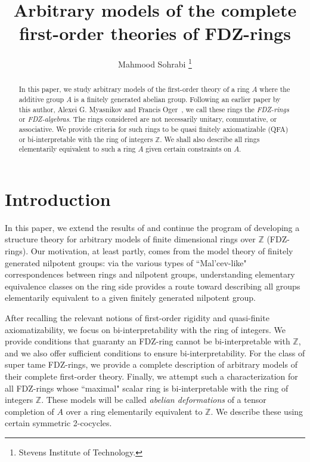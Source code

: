 \documentclass{article}
\title{Arbitrary models of the complete first-order theories of FDZ-rings }
\author{Mahmood Sohrabi \footnote{Stevens Institute of Technology.}}
\date{}
\theoremstyle{remark}
\def\Z{{\mathbb{Z}}}
\begin{document}
\maketitle

\begin{abstract}
In this paper, we study arbitrary models of the first-order theory of a  ring $A$ where the additive group $A$ is a finitely generated abelian group. Following an earlier paper by this author, Alexei G. Myasnikov and Francis Oger~\cite{MOS}, we call these rings the \emph{FDZ-rings} or \emph{FDZ-algebras}. The rings considered are not necessarily unitary, commutative, or associative. We provide criteria for such rings to be quasi finitely axiomatizable (QFA) or bi-interpretable with the ring of integers $\Z$. We shall also describe all rings elementarily equivalent to such a ring $A$ given certain constraints on $A$.
\end{abstract}


\tableofcontents





\maketitle

\section{Introduction}
In this paper, we extend the results of \cite{MOS} and continue the program of developing a structure theory for arbitrary models of finite dimensional rings over $\mathbb{Z}$ (FDZ-rings). Our motivation, at least partly, comes from the model theory of finitely generated nilpotent groups: via the various types of ``Mal'cev-like" correspondences between rings and nilpotent groups, understanding elementary equivalence classes on the ring side provides a route toward describing all groups elementarily equivalent to a given finitely generated nilpotent group. 

After recalling the relevant notions of first-order rigidity and quasi-finite axiomatizability, we focus on bi-interpretability with the ring of integers. We provide conditions that guaranty an FDZ-ring cannot be bi-interpretable with $\mathbb{Z}$, and we also offer sufficient conditions to ensure bi-interpretability. For the class of super tame FDZ-rings, we provide a complete description of arbitrary models of their complete first-order theory. Finally, we attempt such a characterization for all FDZ-rings whose ``maximal" scalar ring is bi-interpretable with the ring of integers $\Z$. These models will be called \emph{abelian deformations} of a tensor completion of $A$ over a ring elementarily equivalent to $\Z$. We describe these using certain symmetric 2-cocycles.
\end{document}
